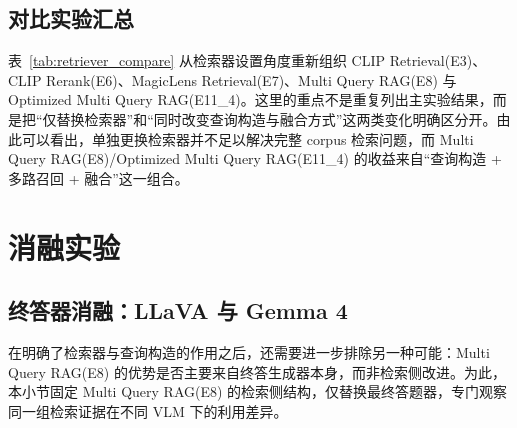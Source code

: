 \subsection{对比实验汇总}

表~\ref{tab:retriever_compare} 从检索器设置角度重新组织 CLIP Retrieval(E3)、CLIP Rerank(E6)、MagicLens Retrieval(E7)、Multi Query RAG(E8) 与 Optimized Multi Query RAG(E11\_4)。这里的重点不是重复列出主实验结果，而是把“仅替换检索器”和“同时改变查询构造与融合方式”这两类变化明确区分开。由此可以看出，单独更换检索器并不足以解决完整 corpus 检索问题，而 Multi Query RAG(E8)/Optimized Multi Query RAG(E11\_4) 的收益来自“查询构造 + 多路召回 + 融合”这一组合。

\begin{table}[!htb]
\centering
\scriptsize
\caption{MagicLens、CLIP 与多维查询侧扩展的对比结果。}
\label{tab:retriever_compare}
\end{table}

\section{消融实验}

\subsection{终答器消融：LLaVA 与 Gemma 4}

在明确了检索器与查询构造的作用之后，还需要进一步排除另一种可能：Multi Query RAG(E8) 的优势是否主要来自终答生成器本身，而非检索侧改进。为此，本小节固定 Multi Query RAG(E8) 的检索侧结构，仅替换最终答题器，专门观察同一组检索证据在不同 VLM 下的利用差异。

